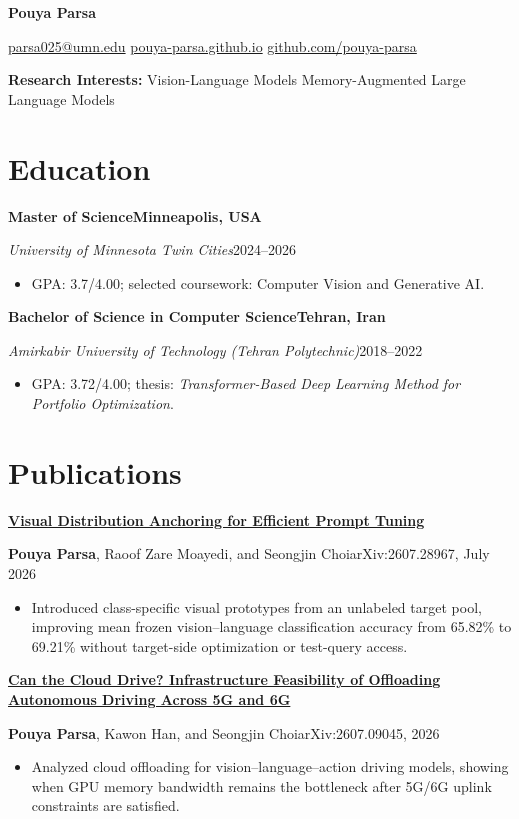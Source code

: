 \documentclass[10pt,letterpaper]{article}
\newcommand{\cvheading}[4]{%
  \needspace{4\baselineskip}%
  \textbf{#1}\hfill\textbf{#2}\par
  \textit{#3}\hfill#4\par
  \vspace{0.15em}%
}
\newcommand{\publication}[5]{%
  \needspace{6\baselineskip}%
  \href{#4}{\textbf{#1}}\par
  #2\hfill#3\par
  \begin{itemize}
    \item #5
  \end{itemize}
  \vspace{0.15em}%
}
\begin{document}
\begin{center}
  {\LARGE\bfseries\color{sectionblue} Pouya Parsa}\par
  \vspace{0.35em}
  \href{mailto:parsa025@umn.edu}{parsa025@umn.edu}
  \enspace\textbullet\enspace
  \href{https://pouya-parsa.github.io}{pouya-parsa.github.io}
  \enspace\textbullet\enspace
  \href{https://github.com/pouya-parsa}{github.com/pouya-parsa}
\end{center}

\vspace{0.25em}
\textbf{Research Interests:} Vision-Language Models \enspace\textbullet\enspace Memory-Augmented Large Language Models

\section{Education}

\cvheading
  {Master of Science}
  {Minneapolis, USA}
  {University of Minnesota Twin Cities}
  {2024--2026}
\begin{itemize}
  \item GPA: 3.7/4.00; selected coursework: Computer Vision and Generative AI.
\end{itemize}

\cvheading
  {Bachelor of Science in Computer Science}
  {Tehran, Iran}
  {Amirkabir University of Technology (Tehran Polytechnic)}
  {2018--2022}
\begin{itemize}
  \item GPA: 3.72/4.00; thesis: \textit{Transformer-Based Deep Learning Method for Portfolio Optimization}.
\end{itemize}

\section{Publications}

\publication
  {Visual Distribution Anchoring for Efficient Prompt Tuning}
  {\textbf{Pouya Parsa}, Raoof Zare Moayedi, and Seongjin Choi}
  {arXiv:2607.28967, July 2026}
  {https://arxiv.org/abs/2607.28967}
  {Introduced class-specific visual prototypes from an unlabeled target pool, improving mean frozen vision--language classification accuracy from 65.82\% to 69.21\% without target-side optimization or test-query access.}

\publication
  {Can the Cloud Drive? Infrastructure Feasibility of Offloading Autonomous Driving Across 5G and 6G}
  {\textbf{Pouya Parsa}, Kawon Han, and Seongjin Choi}
  {arXiv:2607.09045, 2026}
  {https://arxiv.org/abs/2607.09045}
  {Analyzed cloud offloading for vision--language--action driving models, showing when GPU memory bandwidth remains the bottleneck after 5G/6G uplink constraints are satisfied.}
\end{document}
